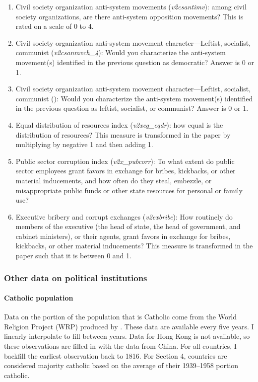 \documentclass[12pt]{article}
\numberwithin{equation}{section}
\begin{document}
\begin{enumerate}
	\item Civil society organization anti-system movements (\textit{v2csantimv}): among civil society organizations, are there anti-system opposition movements?  This is rated on a scale of 0 to 4.
	\item Civil society organization anti-system movement character---Leftist, socialist, communist (\textit{v2csanmvch\_4}): Would you characterize the anti-system movement(s) identified in the previous question as democratic? Answer is 0 or 1.
	\item Civil society organization anti-system movement character---Leftist, socialist, communist (): Would you characterize the anti-system movement(s) identified in the previous question as leftist, socialist, or communist? Answer is 0 or 1.
	\item Equal distribution of resources index (\textit{v2xeg\_eqdr}): how equal is the distribution of resources? This measure is transformed in the paper by multiplying by negative 1 and then adding 1.
	\item Public sector corruption index (\textit{v2x\_pubcorr}): To what extent do public sector employees grant favors in exchange for bribes, kickbacks, or other material inducements, and how often do they steal, embezzle, or misappropriate public funds or other state resources for personal or family use?
	\item Executive bribery and corrupt exchanges (\textit{v2exbribe}): How routinely do members of the executive (the head of state, the head of government, and cabinet ministers), or their agents, grant favors in exchange for bribes, kickbacks, or other material inducements? This measure is transformed in the paper such that it is between 0 and 1.
\end{enumerate}

\subsubsection{Other data on political institutions}\label{section:otherpolinst}

\paragraph{Catholic population}
Data on the portion of the population that is Catholic come from the World Religion Project (WRP) produced by \cite{Maoz2013}. These data are available every five years. I linearly interpolate to fill between years. Data for Hong Kong is not available, so these observations are filled in with the data from China. For all countries, I backfill the earliest observation back to 1816. For Section 4, countries are considered majority catholic based on the average of their 1939--1958 portion catholic.
\end{document}
